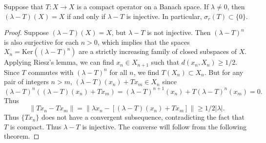 \begin{theorem}
    Suppose that $T: X \to X$ is a compact operator on a Banach space. If $\lambda \neq 0$, then $(\lambda - T)(X) = X$ if and only if $\lambda - T$ is injective. In particular, $\sigma_r(T) \subset \{ 0 \}$.
\end{theorem}
\begin{proof}
    Suppose $(\lambda - T)(X) = X$, but $\lambda - T$ is not injective. Then $(\lambda - T)^n$ is also surjective for each $n > 0$, which implies that the spaces $X_n = \text{Ker}((\lambda - T)^n)$ are a strictly increasing family of closed subspaces of $X$. Applying Riesz's lemma, we can find $x_n \in X_{n+1}$ such that $d(x_n,X_n) \geq 1/2$. Since $T$ commutes with $(\lambda - T)^n$ for all $n$, we find $T(X_n) \subset X_n$. But for any pair of integers $n > m$, $(\lambda - T)(x_n) + Tx_m \in X_n$ since
    \[ (\lambda - T)^n \left( (\lambda - T)(x_n) + Tx_m \right) = (\lambda - T)^{n+1}(x_n) + T(\lambda - T)^n (x_m) = 0. \]
    Thus
    \[ \| Tx_n - Tx_m \| = \| \lambda x_n - [(\lambda - T)(x_n) + Tx_m] \| \geq 1/2 |\lambda|. \]
    Thus $\{ Tx_n \}$ does not have a convergent subsequence, contradicting the fact that $T$ is compact. Thus $\lambda - T$ is injective. The converse will follow from the following theorem.
\end{proof}

